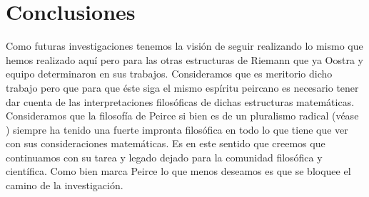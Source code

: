 \documentclass[
	fontsize=10pt, %
	twoside=false, %
	secnumdepth=1, %
	abstract=true, %
]{kaohandt}
\begin{document}

\section{Conclusiones} %
\label{sec:Conclusiones}

Como futuras investigaciones tenemos la visión de seguir realizando lo mismo que hemos realizado aquí pero para las otras estructuras de Riemann que ya Oostra y equipo determinaron en sus trabajos. Consideramos que es meritorio dicho trabajo pero que para que éste siga el mismo espíritu peircano es necesario tener dar cuenta de las interpretaciones filosóficas de dichas estructuras matemáticas. Consideramos que la filosofía de Peirce si bien es de un pluralismo radical (véase ) siempre ha tenido una fuerte impronta filosófica en todo lo que tiene que ver con sus consideraciones matemáticas. Es en este sentido que creemos que continuamos con su tarea y legado dejado para la comunidad filosófica y científica. Como bien marca Peirce lo que menos deseamos es que se bloquee el camino de la investigación.


%
%



\printbibliography[title=Bibliografía] %
\nocite{peirce1931, robin1971}
\end{document}
